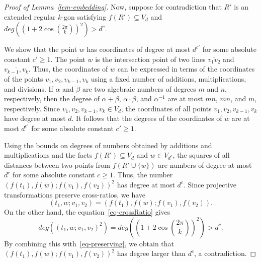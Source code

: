 \documentclass[10pt,a4paper]{amsart}
\begin{document}
\begin{proof}[Proof of Lemma~\ref{lem-embedding}]
Now, suppose for contradiction that $R'$ is an extended regular $k$-gon satisfying $f(R') \subseteq V_d$ and $deg\left(\left(1+2\cos\left(\frac{2\pi}{k}\right)\right)^2\right) > d^c$.

We show that the point $w$ has coordinates of degree at most $d^{c'}$ for some absolute constant $c' \geq 1$.
The point $w$ is the intersection point of two lines $\overline{v_1v_2}$ and $\overline{v_{k-1},v_k}$. 
Thus, the coordinates of $w$ can be expressed in terms of the coordinates of the points $v_1,v_2,v_{k-1},v_k$ using a fixed number of additions, multiplications, and divisions.
If $\alpha$ and $\beta$ are two algebraic numbers of degrees $m$ and $n$, respectively, then the degree of $\alpha + \beta$, $\alpha \cdot \beta$, and $\alpha^{-1}$ are at most $mn$, $mn$, and $m$, respectively.
Since $v_1,v_2,v_{k-1},v_k \in V_d$, the coordinates of all points $v_1,v_2,v_{k-1},v_k$ have degree at most $d$.
It follows that the degrees of the coordinates of $w$ are at most $d^{c'}$ for some absolute constant $c' \geq 1$.

Using the bounds on degrees of numbers obtained by additions and multiplications and the facts $f(R') \subseteq V_d$ and $w \in V_{d^c}$, the squares of all distances between two points from $f(R' \cup \{w\})$ are numbers of degree at most $d^c$ for some absolute constant $c \geq 1$.
Thus, the number $(f(t_1),f(w);f(v_1),f(v_2))^2$ has degree at most $d^c$.
Since projective transformations preserve cross-ratios, we have
\begin{equation}
\label{eq-preserving}
(t_1,w;v_1,v_2) = (f(t_1),f(w);f(v_1),f(v_2)).
\end{equation}
On the other hand, the equation~\eqref{eq-crossRatio} 
gives
\[
deg\left((t_1,w;v_1,v_2)^2\right) = deg\left(\left(1+2\cos\left(\frac{2\pi}{k}\right)\right)^2\right) > d^c.
\]
By combining this with~\eqref{eq-preserving}, we obtain that $(f(t_1),f(w);f(v_1),f(v_2))^2$ has degree larger than $d^c$, a contradiction.
\end{proof}
\end{document}
